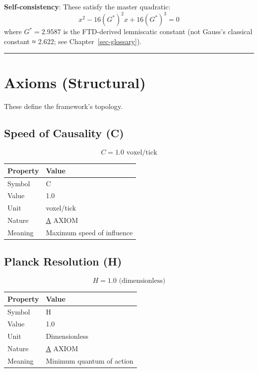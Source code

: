 \documentclass[
  11pt,
  letterpaper,
  twoside,
  openany]{book}
\makeatletter
\let\orig@section\section
\renewcommand{\section}{\needspace{8\baselineskip}\orig@section}
\let\orig@subsection\subsection
\renewcommand{\subsection}{\needspace{6\baselineskip}\orig@subsection}
\makeatother
\begin{document}
\textbf{Self-consistency}: These satisfy the master quadratic: \[
x^2 - 16(G^*)^2 x + 16(G^*)^3 = 0
\] where \(G^* = 2.9587\) is the FTD-derived lemniscatic constant (not
Gauss's classical constant ≈ 2.622; see Chapter~\ref{sec-glossary}).

\begin{center}\rule{0.5\linewidth}{0.5pt}\end{center}

\section{Axioms (Structural)}\label{axioms-structural}

These define the framework's topology.

\subsection{Speed of Causality (C)}\label{speed-of-causality-c}

\[
C = 1.0 \text{ voxel/tick}
\]

\begin{longtable}[]{@{}ll@{}}
\toprule\noalign{}
Property & Value \\
\midrule\noalign{}
\endhead
\bottomrule\noalign{}
\endlastfoot
Symbol & C \\
Value & 1.0 \\
Unit & voxel/tick \\
Nature & \hyperref[a]{A} AXIOM \\
Meaning & Maximum speed of influence \\
\end{longtable}

\subsection{Planck Resolution (H)}\label{planck-resolution-h}

\[
H = 1.0 \text{ (dimensionless)}
\]

\begin{longtable}[]{@{}ll@{}}
\toprule\noalign{}
Property & Value \\
\midrule\noalign{}
\endhead
\bottomrule\noalign{}
\endlastfoot
Symbol & H \\
Value & 1.0 \\
Unit & Dimensionless \\
Nature & \hyperref[a]{A} AXIOM \\
Meaning & Minimum quantum of action \\
\end{longtable}
\end{document}
